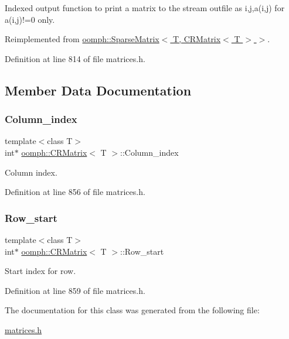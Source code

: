 Indexed output function to print a matrix to the stream outfile as i,j,a(i,j) for a(i,j)!=0 only. 



Reimplemented from \hyperlink{classoomph_1_1SparseMatrix_a84a08f7e77be50af6a5655cbe0609619}{oomph\+::\+Sparse\+Matrix$<$ T, C\+R\+Matrix$<$ T $>$ $>$}.



Definition at line 814 of file matrices.\+h.



\subsection{Member Data Documentation}
\mbox{\label{classoomph_1_1CRMatrix_a713740a548e1b022b4153145c465a2c3}} 
\subsubsection{\texorpdfstring{Column\+\_\+index}{Column\_index}}
{\footnotesize\ttfamily template$<$class T$>$ \\
int$\ast$ \hyperlink{classoomph_1_1CRMatrix}{oomph\+::\+C\+R\+Matrix}$<$ T $>$\+::Column\+\_\+index\hspace{0.3cm}{\ttfamily [protected]}}



Column index. 



Definition at line 856 of file matrices.\+h.

\mbox{\label{classoomph_1_1CRMatrix_a6d2a0db8650e65c9278febe27feeb22e}} 
\subsubsection{\texorpdfstring{Row\+\_\+start}{Row\_start}}
{\footnotesize\ttfamily template$<$class T$>$ \\
int$\ast$ \hyperlink{classoomph_1_1CRMatrix}{oomph\+::\+C\+R\+Matrix}$<$ T $>$\+::Row\+\_\+start\hspace{0.3cm}{\ttfamily [protected]}}



Start index for row. 



Definition at line 859 of file matrices.\+h.



The documentation for this class was generated from the following file\+:\begin{DoxyCompactItemize}
\item 
\hyperlink{matrices_8h}{matrices.\+h}\end{DoxyCompactItemize}
